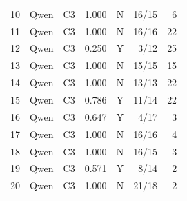 \begin{longtable}{llrrlrr}
    10 & Qwen & C3 & 1.000 & N & 16/15 & 6 \\
    11 & Qwen & C3 & 1.000 & N & 16/16 & 22 \\
    12 & Qwen & C3 & 0.250 & Y & 3/12 & 25 \\
    13 & Qwen & C3 & 1.000 & N & 15/15 & 15 \\
    14 & Qwen & C3 & 1.000 & N & 13/13 & 22 \\
    15 & Qwen & C3 & 0.786 & Y & 11/14 & 22 \\
    16 & Qwen & C3 & 0.647 & Y & 4/17 & 3 \\
    17 & Qwen & C3 & 1.000 & N & 16/16 & 4 \\
    18 & Qwen & C3 & 1.000 & N & 16/15 & 3 \\
    19 & Qwen & C3 & 0.571 & Y & 8/14 & 2 \\
    20 & Qwen & C3 & 1.000 & N & 21/18 & 2 \\
\end{longtable}
